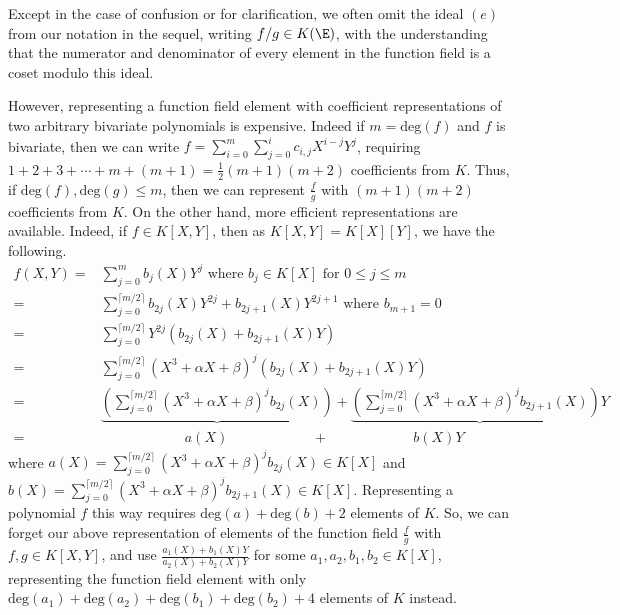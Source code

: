 \documentclass[11pt,letterpaper]{article}
\theoremstyle{definition}
\newcommand{\6}{\mathbf}
\newcommand{\7}{\mathcal}
\begin{document}
Except in the case of confusion or for clarification, we often omit the ideal $(e)$ from our notation in the sequel, writing $f/g \in K(\E)$, with the understanding that the numerator and denominator of every element in the function field is a coset modulo this ideal.

However, representing a function field element with coefficient representations of two arbitrary bivariate polynomials is expensive. Indeed if $m = \text{deg}(f)$ and $f$ is bivariate, then we can write $f = \sum_{i=0}^{m} \sum_{j=0}^{i} c_{i,j}X^{i-j}Y^j$, requiring $1 + 2 + 3 + \cdots + m + (m+1) = \frac{1}{2}(m+1)(m+2)$ coefficients from $K$. Thus, if $\text{deg}(f), \text{deg}(g) \leq m$, then we can represent $\frac{f}{g}$ with $(m+1)(m+2)$ coefficients from $K$. On the other hand, more efficient representations are available. Indeed, if $f \in K[X,Y]$, then as $K[X,Y] = K[X][Y]$, we have the following.
\begin{align*}
f(X,Y)
=& \sum_{j=0}^{m} b_{j}(X)Y^j\text{ where }b_j \in K[X]\text{ for }0 \leq j \leq m  \\
=& \sum_{j=0}^{\lceil m/2\rceil} b_{2j}(X)Y^{2j} + b_{2j+1}(X)Y^{2j+1} \text{ where }b_{m+1}=0\\
=& \sum_{j=0}^{\lceil m/2\rceil} Y^{2j}\left(b_{2j}(X) + b_{2j+1}(X)Y\right)\\
=& \sum_{j=0}^{\lceil m/2\rceil} \left(X^3 + \alpha X + \beta\right)^j\left(b_{2j}(X) + b_{2j+1}(X)Y\right) \\
=& \underbrace{\left(\sum_{j=0}^{\lceil m/2\rceil} \left(X^3 + \alpha X + \beta\right)^jb_{2j}(X)\right)}{} + \underbrace{\left(\sum_{j=0}^{\lceil m/2\rceil} \left(X^3 + \alpha X + \beta\right)^jb_{2j+1}(X)\right){}Y} \\
=& \quad \quad \quad \quad \quad \quad a(X)  \quad \quad \quad \quad \quad \quad + \quad \quad \quad \quad \quad \quad b(X)Y
\end{align*} where $a(X) = \sum_{j=0}^{\lceil m/2\rceil} (X^3 + \alpha X + \beta)^j b_{2j}(X) \in K[X]$ and $b(X) = \sum_{j=0}^{\lceil m/2\rceil} (X^3 + \alpha X + \beta)^j b_{2j+1}(X) \in K[X]$. Representing a polynomial $f$ this way requires $\text{deg}(a) + \text{deg}(b)+2$ elements of $K$. So, we can forget our above representation of elements of the function field $\frac{f}{g}$ with $f, g \in K[X,Y]$, and use $\frac{a_1(X) + b_1(X)Y}{a_2(X) + b_2(X)Y}$ for some $a_1, a_2, b_1, b_2 \in K\left[X\right]$, representing the function field element with only $\text{deg}(a_1)+\text{deg}(a_2)+\text{deg}(b_1)+\text{deg}(b_2)+4$ elements of $K$ instead. 
\end{document}

